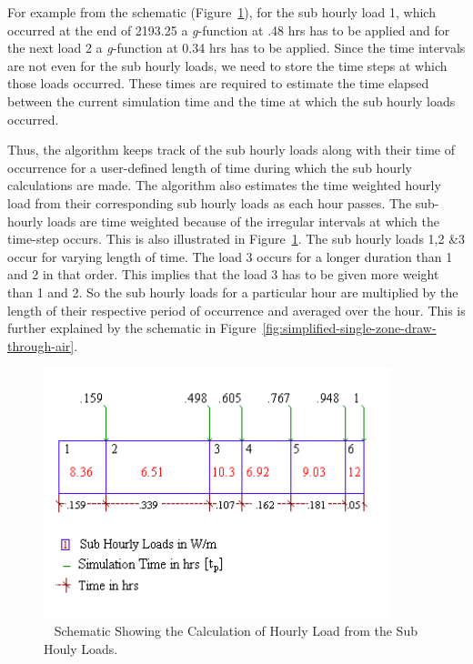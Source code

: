 For example from the schematic (Figure~\ref{fig:schematic-showing-the-calculation-of-hourly}), for the sub hourly load 1, which occurred at the end of 2193.25 a \emph{g}-function at .48 hrs has to be applied and for the next load 2 a \emph{g}-function at 0.34 hrs has to be applied. Since the time intervals are not even for the sub hourly loads, we need to store the time steps at which those loads occurred. These times are required to estimate the time elapsed between the current simulation time and the time at which the sub hourly loads occurred.

Thus, the algorithm keeps track of the sub hourly loads along with their time of occurrence for a user-defined length of time during which the sub hourly calculations are made. The algorithm also estimates the time weighted hourly load from their corresponding sub hourly loads as each hour passes. The sub-hourly loads are time weighted because of the irregular intervals at which the time-step occurs. This is also illustrated in Figure~\ref{fig:schematic-showing-the-calculation-of-hourly}. The sub hourly loads 1,2 \&3 occur for varying length of time. The load 3 occurs for a longer duration than 1 and 2 in that order. This implies that the load 3 has to be given more weight than 1 and 2. So the sub hourly loads for a particular hour are multiplied by the length of their respective period of occurrence and averaged over the hour. This is further explained by the schematic in Figure~\ref{fig:simplified-single-zone-draw-through-air}.

\begin{figure}[hbtp] %
\centering
\includegraphics[width=0.9\textwidth, height=0.9\textheight, keepaspectratio=true]{media/image5657.png}
\caption{  Schematic Showing the Calculation of Hourly Load from the Sub Houly Loads. \protect \label{fig:schematic-showing-the-calculation-of-hourly}}
\end{figure}

